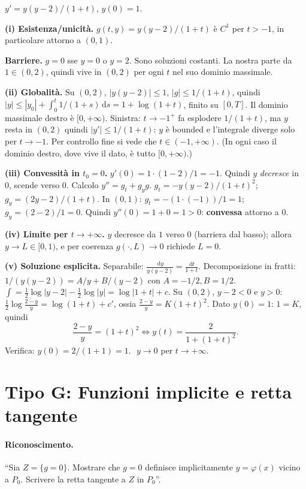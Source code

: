 \documentclass[11pt,a4paper,openany]{book}
\theoremstyle{plain}
\theoremstyle{definition}
\theoremstyle{remark}
\newcommand{\dd}{\,\mathrm{d}}
\begin{document}
\begin{esempio}[title={4/7/2024 --- Esercizio 5}]
$y'=y(y-2)/(1+t)$, $y(0)=1$.

\textbf{(i) Esistenza/unicit\`a.} $g(t,y)=y(y-2)/(1+t)$ \`e $C^1$ per
$t>-1$, in particolare attorno a $(0,1)$.

\textbf{Barriere.} $g=0$ sse $y=0$ o $y=2$. Sono soluzioni costanti.
La nostra parte da $1\in(0,2)$, quindi vive in $(0,2)$ per ogni $t$
nel suo dominio massimale.

\textbf{(ii) Globalit\`a.} Su $(0,2)$, $|y(y-2)|\le 1$, $|g|\le 1/(1+t)$,
quindi $|y|\le |y_0|+\int_0^t 1/(1+s)\dd s=1+\log(1+t)$, finito su $[0,T]$.
Il dominio massimale destro \`e $[0,+\infty)$. Sinistra: $t\to-1^+$
fa esplodere $1/(1+t)$, ma $y$ resta in $(0,2)$ quindi $|y'|\le 1/(1+t)$:
$y$ \`e bounded e l'integrale diverge solo per $t\to -1$. Per controllo
fine si vede che $t\in(-1,+\infty)$. (In ogni caso il dominio destro,
dove vive il dato, \`e tutto $[0,+\infty)$.)

\textbf{(iii) Convessit\`a in $t_0=0$.}
$y'(0)=1\cdot(1-2)/1=-1$. Quindi $y$ \emph{decresce} in 0, scende
verso 0. Calcolo
$y''=g_t+g_y g$. $g_t=-y(y-2)/(1+t)^2$;
$g_y=(2y-2)/(1+t)$. In $(0,1)$:
$g_t=-(1\cdot(-1))/1=1$; $g_y=(2-2)/1=0$. Quindi $y''(0)=1+0=1>0$:
\textbf{convessa} attorno a $0$.

\textbf{(iv) Limite per $t\to+\infty$.} $y$ decresce da $1$ verso $0$
(barriera dal basso); allora $y\to L\in[0,1)$, e per coerenza
$g(\cdot,L)\to 0$ richiede $L=0$.

\textbf{(v) Soluzione esplicita.} Separabile:
$\frac{\dd y}{y(y-2)}=\frac{\dd t}{1+t}$.
Decomposizione in fratti: $1/(y(y-2))=A/y+B/(y-2)$ con $A=-1/2,B=1/2$.
$\int=\frac12\log|y-2|-\frac12\log|y|=\log|1+t|+c$.
Su $(0,2)$, $y-2<0$ e $y>0$:
$\frac12\log\frac{2-y}{y}=\log(1+t)+c'$, ossia
$\frac{2-y}{y}=K(1+t)^2$.
Dato $y(0)=1$: $1=K$, quindi
\[
\frac{2-y}{y}=(1+t)^2\Longleftrightarrow y(t)=\frac{2}{1+(1+t)^2}.
\]
Verifica: $y(0)=2/(1+1)=1$.\,\checkmark\, $y\to 0$ per $t\to+\infty$.\,\checkmark
\end{esempio}

\section{Tipo G: Funzioni implicite e retta tangente}

\paragraph{Riconoscimento.} ``Sia $Z=\{g=0\}$. Mostrare che $g=0$
definisce implicitamente $y=\varphi(x)$ vicino a $P_0$. Scrivere la
retta tangente a $Z$ in $P_0$''.
\end{document}
